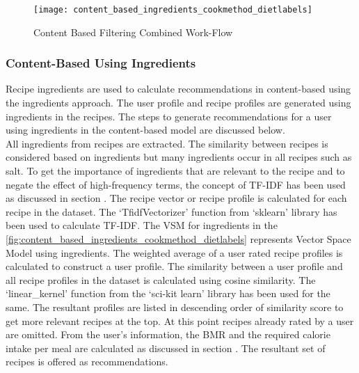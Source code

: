\begin{singlespace}
\begin{figure}[H]
	\centering
	\texttt{[image: content\_based\_ingredients\_cookmethod\_dietlabels]}
	\caption{Content Based Filtering Combined Work-Flow }
	\label{fig:content_based_ingredients_cookmethod_dietlabels}
\end{figure}  
\end{singlespace}


\subsubsection{Content-Based Using Ingredients}
\label{sec:cb_ingredients}
Recipe ingredients are used to calculate recommendations in content-based using the ingredients approach. The user profile and recipe profiles are generated using ingredients in the recipes. The steps to generate recommendations for a user using ingredients in the content-based model are discussed below.\\
All ingredients from recipes are extracted. The similarity between recipes is considered based on ingredients but many ingredients occur in all recipes such as salt. To get the importance of ingredients that are relevant to the recipe and to negate the effect of high-frequency terms, the concept of TF-IDF has been used as discussed in section . The recipe vector or recipe profile is calculated for each recipe in the dataset. The \lq{}TfidfVectorizer\rq{} function from \lq{}sklearn\rq{} library has been used to calculate TF-IDF. The VSM for ingredients in the \autoref{fig:content_based_ingredients_cookmethod_dietlabels} represents Vector Space Model using ingredients. The weighted average of a user rated recipe profiles is calculated to construct a user profile. The similarity between a user profile and all recipe profiles in the dataset is calculated using cosine similarity. The \lq{}linear\_kernel\rq{} function from the \lq{}sci-kit learn\rq{} library has been used for the same. The resultant profiles are listed in descending order of similarity score to get more relevant recipes at the top. At this point recipes already rated by a user are omitted. From the user's information, the BMR and the required calorie intake per meal are calculated as discussed in section . The resultant set of recipes is offered as recommendations. 

